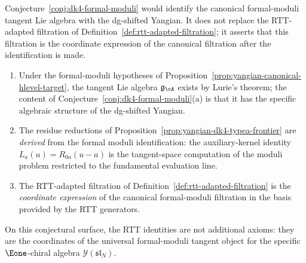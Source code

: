 \begin{remark}
\label{rem:dk4-formal-moduli-vs-rtt}
Conjecture~\ref{conj:dk4-formal-moduli} would identify the canonical
formal-moduli tangent Lie algebra with the dg-shifted Yangian. It does
not replace the RTT-adapted filtration of
Definition~\ref{def:rtt-adapted-filtration}; it asserts that this
filtration is the coordinate expression of the canonical filtration
after the identification is made.
\begin{enumerate}[label=\textup{(\roman*)}]
\item Under the formal-moduli hypotheses of
 Proposition~\ref{prop:yangian-canonical-hlevel-target}, the tangent
 Lie algebra $\mathfrak{g}_{\cA}$ exists by Lurie's theorem; the
 content of
 Conjecture~\ref{conj:dk4-formal-moduli}(a) is that it has the
 specific algebraic structure of the dg-shifted Yangian.
\item The residue reductions of
 Proposition~\ref{prop:yangian-dk4-typea-frontier} are
 \emph{derived} from the formal moduli identification:
 the auxiliary-kernel identity $L_a(u) = R_{0a}(u-a)$ is
 the tangent-space computation of the moduli problem
 restricted to the fundamental evaluation line.
\item The RTT-adapted filtration of
 Definition~\ref{def:rtt-adapted-filtration} is the
 \emph{coordinate expression} of the canonical formal-moduli
 filtration in the basis provided by the RTT generators.
\end{enumerate}
On this conjectural surface, the RTT identities are not additional
axioms: they are the coordinates of the universal formal-moduli
tangent object for the specific $\Eone$-chiral algebra
$\mathcal{Y}(\mathfrak{sl}_N)$.
\end{remark}

